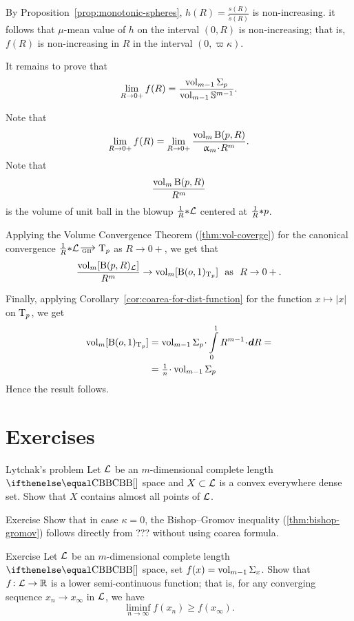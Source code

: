 By Proposition~\ref{prop:monotonic-spheres}, 
$h(R)= \frac {s(R)}{\tilde s(R)}$ is non-increasing.
it follows that $\mu$-mean value of $h$ on the interval  $(0,R)$ 
is non-increasing;
that is, $f(R)$ is non-increasing in $R$ in the interval $(0,\varpi\kappa)$.




It remains to prove that 
\[\lim_{R\to0+}f(R)
=
\frac{\vol_{m-1}\Sigma_p}{\vol_{m-1} \SS^{m-1}}.\]

Note that
\[\lim_{R\to0+}f(R)=\lim_{R\to0+} \frac{\vol_m\oBall(p,R)}{\alpha_m\cdot R^{ m}}.\]
Note that 
\[\frac{\mathop{\rm vol}\nolimits_m\mathrm{B}{}(p,R)}{R^{m}}\]
is the volume of unit ball in the blowup 
$\tfrac1R{*} \mathcal{L}$ centered at $\tfrac1R{*} p$.

Applying the Volume Convergence Theorem (\ref{thm:vol-coverge})
for the canonical convergence $\tfrac1R\blow\spc{L}\GHto \T_p$ as $R\to 0+$,
we get that 
\[\frac{\vol_m[\oBall(p,R)_{\spc{L}}]}{R^m}
\to
\vol_m[\oBall(o,1)_{\T_p}]\ \ \text{as} \ \ R\to0+.\]

Finally, applying Corollary~\ref{cor:coarea-for-dist-function}
for the function $x\mapsto |x|$ on $\text{\rm T}_p$, we get
\begin{align*}
\vol_m[\oBall(o,1)_{\T_p}]
&=
\vol_{m-1}\Sigma_p\cdot\int\limits_0^1 R^{m-1}\cdot\d R=
\\
&=\tfrac1n\cdot\vol_{m-1}\Sigma_p
\end{align*}
Hence the result follows.
\qeds

\section{Exercises}


\begin{thm}{Lytchak's problem}
Let $\mathcal{L}$ be an $m$-dimensional complete length $\Alex{}$ space and $X\subset\spc{L}$ is a convex everywhere dense set.
Show that $X$ contains almost all points  of $\mathcal{L}$.
\end{thm}


\begin{thm}{Exercise}
Show that in case $\kappa=0$,
the Bishop--Gromov inequality (\ref{thm:bishop-gromov})
follows directly from ??? without using coarea formula.
\end{thm}

\begin{thm}{Exercise}
Let $\mathcal{L}$ be an $m$-dimensional complete length $\Alex{}$ space,
set $f(x)=\mathop{\rm vol}\nolimits_{m-1}\Sigma_x$.
Show that $f\:\spc{L}\to\RR$ is a lower semi-continuous function;
that is, for any converging sequence $x_n\to x_\infty$ in $\mathcal{L}$,
we have 
\[\liminf_{n\to\infty}f(x_n)\ge f(x_\infty).\]
\end{thm}

